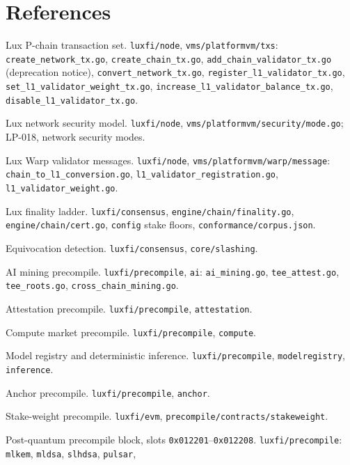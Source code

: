\documentclass[11pt,a4paper]{article}
\theoremstyle{definition}
\theoremstyle{remark}
\newcommand{\code}[1]{\texttt{#1}}
\begin{document}
\section*{References}

\begin{enumerate}[label={[\arabic*]},leftmargin=2.6em]
\item Lux P-chain transaction set. \code{luxfi/node}, \code{vms/platformvm/txs}:
\code{create\_network\_tx.go}, \code{create\_chain\_tx.go},
\code{add\_chain\_validator\_tx.go} (deprecation notice),
\code{convert\_network\_tx.go}, \code{register\_l1\_validator\_tx.go},
\code{set\_l1\_validator\_weight\_tx.go},
\code{increase\_l1\_validator\_balance\_tx.go}, \code{disable\_l1\_validator\_tx.go}.
\item Lux network security model. \code{luxfi/node},
\code{vms/platformvm/security/mode.go}; LP-018, network security modes.
\item Lux Warp validator messages. \code{luxfi/node},
\code{vms/platformvm/warp/message}: \code{chain\_to\_l1\_conversion.go},
\code{l1\_validator\_registration.go}, \code{l1\_validator\_weight.go}.
\item Lux finality ladder. \code{luxfi/consensus},
\code{engine/chain/finality.go}, \code{engine/chain/cert.go},
\code{config} stake floors, \code{conformance/corpus.json}.
\item Equivocation detection. \code{luxfi/consensus}, \code{core/slashing}.
\item AI mining precompile. \code{luxfi/precompile}, \code{ai}:
\code{ai\_mining.go}, \code{tee\_attest.go}, \code{tee\_roots.go},
\code{cross\_chain\_mining.go}.
\item Attestation precompile. \code{luxfi/precompile}, \code{attestation}.
\item Compute market precompile. \code{luxfi/precompile}, \code{compute}.
\item Model registry and deterministic inference. \code{luxfi/precompile},
\code{modelregistry}, \code{inference}.
\item Anchor precompile. \code{luxfi/precompile}, \code{anchor}.
\item Stake-weight precompile. \code{luxfi/evm},
\code{precompile/contracts/stakeweight}.
\item Post-quantum precompile block, slots \code{0x012201}--\code{0x012208}.
\code{luxfi/precompile}: \code{mlkem}, \code{mldsa}, \code{slhdsa}, \code{pulsar},

\end{enumerate}
\end{document}
